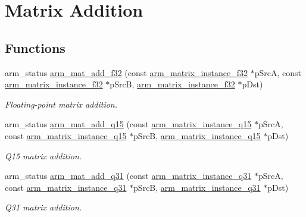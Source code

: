 \hypertarget{group___matrix_add}{\section{Matrix Addition}
\label{group___matrix_add}
}
\subsection*{Functions}
\begin{DoxyCompactItemize}
\item 
arm\-\_\-status \hyperlink{group___matrix_add_ga04bbf64a5f9c9e57dd1efb26a768aba1}{arm\-\_\-mat\-\_\-add\-\_\-f32} (const \hyperlink{structarm__matrix__instance__f32}{arm\-\_\-matrix\-\_\-instance\-\_\-f32} $\ast$p\-Src\-A, const \hyperlink{structarm__matrix__instance__f32}{arm\-\_\-matrix\-\_\-instance\-\_\-f32} $\ast$p\-Src\-B, \hyperlink{structarm__matrix__instance__f32}{arm\-\_\-matrix\-\_\-instance\-\_\-f32} $\ast$p\-Dst)
\begin{DoxyCompactList}\small\item\em Floating-\/point matrix addition. \end{DoxyCompactList}\item 
arm\-\_\-status \hyperlink{group___matrix_add_ga147e90b7c12a162735ab8824127a33ee}{arm\-\_\-mat\-\_\-add\-\_\-q15} (const \hyperlink{structarm__matrix__instance__q15}{arm\-\_\-matrix\-\_\-instance\-\_\-q15} $\ast$p\-Src\-A, const \hyperlink{structarm__matrix__instance__q15}{arm\-\_\-matrix\-\_\-instance\-\_\-q15} $\ast$p\-Src\-B, \hyperlink{structarm__matrix__instance__q15}{arm\-\_\-matrix\-\_\-instance\-\_\-q15} $\ast$p\-Dst)
\begin{DoxyCompactList}\small\item\em Q15 matrix addition. \end{DoxyCompactList}\item 
arm\-\_\-status \hyperlink{group___matrix_add_ga7d9d7d81a0832a17b831aad1e4a5dc16}{arm\-\_\-mat\-\_\-add\-\_\-q31} (const \hyperlink{structarm__matrix__instance__q31}{arm\-\_\-matrix\-\_\-instance\-\_\-q31} $\ast$p\-Src\-A, const \hyperlink{structarm__matrix__instance__q31}{arm\-\_\-matrix\-\_\-instance\-\_\-q31} $\ast$p\-Src\-B, \hyperlink{structarm__matrix__instance__q31}{arm\-\_\-matrix\-\_\-instance\-\_\-q31} $\ast$p\-Dst)
\begin{DoxyCompactList}\small\item\em Q31 matrix addition. \end{DoxyCompactList}\end{DoxyCompactItemize}


